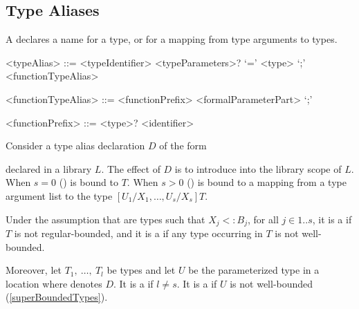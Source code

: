 \documentclass[makeidx]{article}
\begin{document}
{\subsection{Type Aliases}

\LMHash{}%
A  declares a name for a type,
or for a mapping from type arguments to types.


\begin{grammar}
<typeAlias> ::= \gnewline{}
  \TYPEDEF{} <typeIdentifier> <typeParameters>? `=' <type> `;'
  \alt \TYPEDEF{} <functionTypeAlias>

<functionTypeAlias> ::= <functionPrefix> <formalParameterPart> `;'

<functionPrefix> ::= <type>? <identifier>
\end{grammar}

\LMHash{}%
Consider a type alias declaration $D$ of the form

\noindent
{}

\noindent
declared in a library $L$.
The effect of $D$ is to introduce \id{} into the library scope of $L$.
When $s = 0$
()
\id{} is bound to $T$.
When $s > 0$
()
\id{} is bound to a mapping from a type argument list
to the type
$[U_1/X_1, \ldots, U_s/X_s]T$.

\LMHash{}%
Under the assumption that  are types such that
$X_j <: B_j$, for all $j \in 1 .. s$,
it is a  if $T$ is not regular-bounded,
and it is a
 if any type occurring in $T$ is not well-bounded.


\LMHash{}%
Moreover,
let $T_1,\ \ldots,\ T_l$ be types
and let $U$ be the parameterized type 
in a location where \id{} denotes $D$.
It is a  if $l \not= s$.
It is a  if $U$ is not well-bounded
(\ref{superBoundedTypes}).

}
\end{document}
